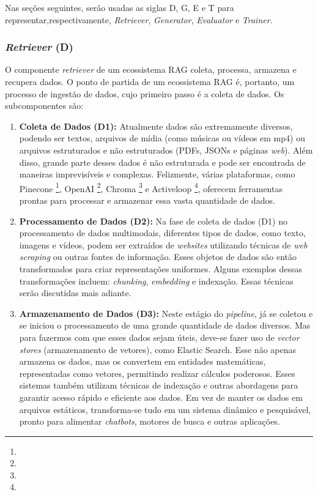 \documentclass[a4paper, 12pt]{article}
\begin{document}
    Nas seções seguintes, serão usadas as siglas D, G, E e T para representar,respectivamente, \textit{Retriever}, \textit{Generator}, \textit{Evaluator} e \textit{Trainer}.

    \subsubsection{\textit{Retriever} (D)}

    O componente \textit{retriever} de um ecossistema RAG coleta, processa, armazena e recupera dados. O ponto de partida de um ecossistema RAG é, portanto, um processo de ingestão de dados, cujo primeiro passo é a coleta de dados. Os subcomponentes são:

    \begin{enumerate}
        \item \textbf{Coleta de Dados (D1):} Atualmente dados são extremamente diversos, podendo ser textos, arquivos de mídia (como músicas ou vídeos em mp4) ou arquivos estruturados e não estruturados (PDFs, JSONs e páginas \textit{web}). Além disso, grande parte desses dados é não estruturada e pode ser encontrada de maneiras imprevisíveis e complexas. Felizmente, várias plataformas, como Pinecone \footnote{}, OpenAI \footnote{}, Chroma \footnote{} e Activeloop \footnote{}, oferecem ferramentas prontas para processar e armazenar essa vasta quantidade de dados.
        \item \textbf{Processamento de Dados (D2):} Na fase de coleta de dados (D1) no processamento de dados multimodais, diferentes tipos de dados, como texto, imagens e vídeos, podem ser extraídos de \textit{websites} utilizando técnicas de \textit{web scraping} ou outras fontes de informação. Esses objetos de dados são então transformados para criar representações uniformes. Alguns exemplos dessas transformações incluem: \textit{chunking}, \textit{embedding} e indexação. Essas técnicas serão discutidas mais adiante.
        \item \textbf{Armazenamento de Dados (D3):} Neste estágio do \textit{pipeline}, já se coletou e se iniciou o processamento de uma grande quantidade de dados diversos. Mas para fazermos com que esses dados sejam úteis, deve-se fazer uso de \textit{vector stores} (armazenamento de vetores), como Elastic Search. Esse não apenas armazena os dados, mas os convertem em entidades matemáticas, representadas como vetores, permitindo realizar cálculos poderosos. Esses sistemas também utilizam técnicas de indexação e outras abordagens para garantir acesso rápido e eficiente aos dados. Em vez de manter os dados em arquivos estáticos, transforma-se tudo em um sistema dinâmico e pesquisável, pronto para alimentar \textit{chatbots}, motores de busca e outras aplicações.

\end{enumerate}
\end{document}

